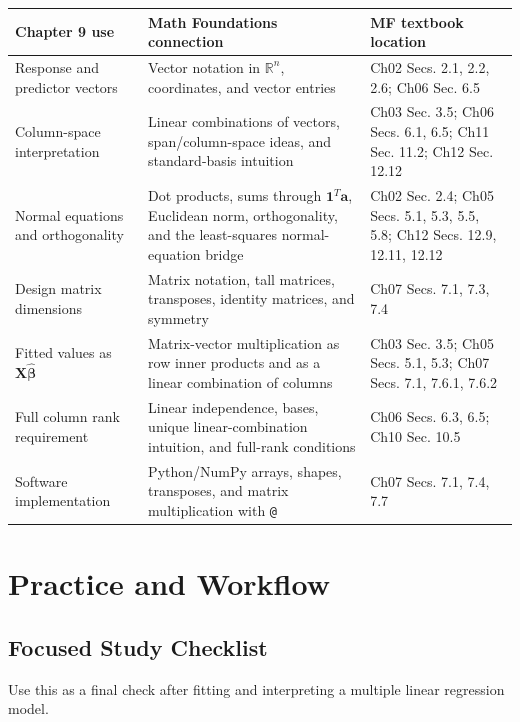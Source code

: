 {\begin{center}
\begin{tabular}{|p{}|p{}|p{}|}
\hline
\textbf{Chapter 9 use} & \textbf{Math Foundations connection} & \textbf{MF textbook location} \\
\hline
Response and predictor vectors & Vector notation in \(\mathbb{R}^n\), coordinates, and vector entries & Ch02 Secs. 2.1, 2.2, 2.6; Ch06 Sec. 6.5 \\
\hline
Column-space interpretation & Linear combinations of vectors, span/column-space ideas, and standard-basis intuition & Ch03 Sec. 3.5; Ch06 Secs. 6.1, 6.5; Ch11 Sec. 11.2; Ch12 Sec. 12.12 \\
\hline
Normal equations and orthogonality & Dot products, sums through \(\mathbf{1}^T\mathbf{a}\), Euclidean norm, orthogonality, and the least-squares normal-equation bridge & Ch02 Sec. 2.4; Ch05 Secs. 5.1, 5.3, 5.5, 5.8; Ch12 Secs. 12.9, 12.11, 12.12 \\
\hline
Design matrix dimensions & Matrix notation, tall matrices, transposes, identity matrices, and symmetry & Ch07 Secs. 7.1, 7.3, 7.4 \\
\hline
Fitted values as \(\mathbf{X}\widehat{\boldsymbol{\beta}}\) & Matrix-vector multiplication as row inner products and as a linear combination of columns & Ch03 Sec. 3.5; Ch05 Secs. 5.1, 5.3; Ch07 Secs. 7.1, 7.6.1, 7.6.2 \\
\hline
Full column rank requirement & Linear independence, bases, unique linear-combination intuition, and full-rank conditions & Ch06 Secs. 6.3, 6.5; Ch10 Sec. 10.5 \\
\hline
Software implementation & Python/NumPy arrays, shapes, transposes, and matrix multiplication with \texttt{@} & Ch07 Secs. 7.1, 7.4, 7.7 \\
\hline
\end{tabular}
\end{center}

\section{Practice and Workflow}
\subsection*{Focused Study Checklist}

Use this as a final check after fitting and interpreting a multiple linear regression model.

}
